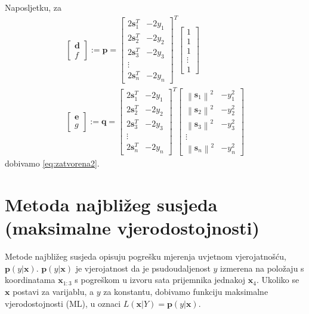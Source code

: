 \documentclass[a4paper,twoside,12pt]{memoir} %
\begin{document}
Naposljetku, za
\begin{align*}
	\begin{bmatrix}
	\mathbf{d} \\
	f
	\end{bmatrix}:=
	\mathbf{p} = \begin{bmatrix}
	2\mathbf{s}_1^T & -2y_1\\
	2\mathbf{s}_2^T & -2y_2 \\
	2\mathbf{s}_3^T & -2y_3\\
	\vdots \\
	2\mathbf{s}_n^T & -2y_n
	\end{bmatrix}^T 
	\begin{bmatrix}
	1 \\
	1 \\
	1 \\
	\vdots \\
	1 
	\end{bmatrix} 
	\\ 
	\begin{bmatrix}
	\mathbf{e} \\
	g
	\end{bmatrix}:=
	\mathbf{q} = \begin{bmatrix}
	2\mathbf{s}_1^T & -2y_1\\
	2\mathbf{s}_2^T & -2y_2 \\
	2\mathbf{s}_3^T & -2y_3\\
	\vdots \\
	2\mathbf{s}_n^T & -2y_n
	\end{bmatrix}^T
	\begin{bmatrix}
	\left \| \mathbf{s}_1\right \|^2 & -y_1^2\\
	\left \| \mathbf{s}_2\right \|^2 & -y_2^2\\
	\left \| \mathbf{s}_3\right \|^2 & -y_3^2\\
	\vdots \\
	\left \| \mathbf{s}_n\right \|^2 & -y_n^2
	\end{bmatrix}
\end{align*}
dobivamo \ref{eq:zatvorena2}.

\section{Metoda najbližeg susjeda (maksimalne vjerodostojnosti)}\label{sec:MLE}
Metode najbližeg susjeda opisuju pogrešku mjerenja uvjetnom vjerojatnošću,
$\mathbf{p}(y|\mathbf{x})$.
$\mathbf{p}(y|\mathbf{x})$ je vjerojatnost da je psudoudaljenost $y$ izmerena na položaju
s koordinatama $\mathbf{x}_{1:3}$ s pogreškom u izvoru sata prijemnika jednakoj $\mathbf{x}_4$.
Ukoliko se $\mathbf{x}$ postavi za varijablu, a $y$ za konstantu, dobivamo
funkciju maksimalne vjerodostojnosti (ML), u oznaci
$L(\mathbf{x}|Y) =\mathbf{p}(y|\mathbf{x})$.
\end{document}

